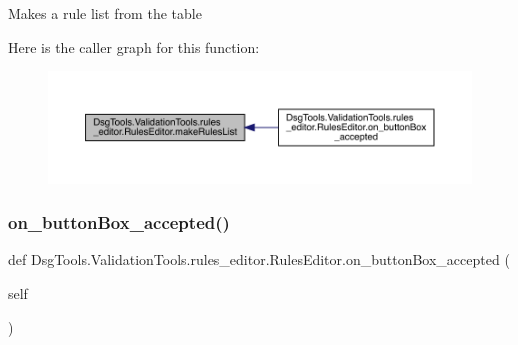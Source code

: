 \begin{DoxyVerb}Makes a rule list from the table
\end{DoxyVerb}
 Here is the caller graph for this function\+:
\nopagebreak
\begin{figure}[H]
\begin{center}
\leavevmode
\includegraphics[width=350pt]{class_dsg_tools_1_1_validation_tools_1_1rules__editor_1_1_rules_editor_a8b098bf9c7bfb628789f3bb23f122d9c_icgraph}
\end{center}
\end{figure}
\mbox{\label{class_dsg_tools_1_1_validation_tools_1_1rules__editor_1_1_rules_editor_a6be23e41b64b56984b901dc1241f0e34}} 
\subsubsection{\texorpdfstring{on\+\_\+button\+Box\+\_\+accepted()}{on\_buttonBox\_accepted()}}
{\footnotesize\ttfamily def Dsg\+Tools.\+Validation\+Tools.\+rules\+\_\+editor.\+Rules\+Editor.\+on\+\_\+button\+Box\+\_\+accepted (\begin{DoxyParamCaption}\item[{}]{self }\end{DoxyParamCaption})}

